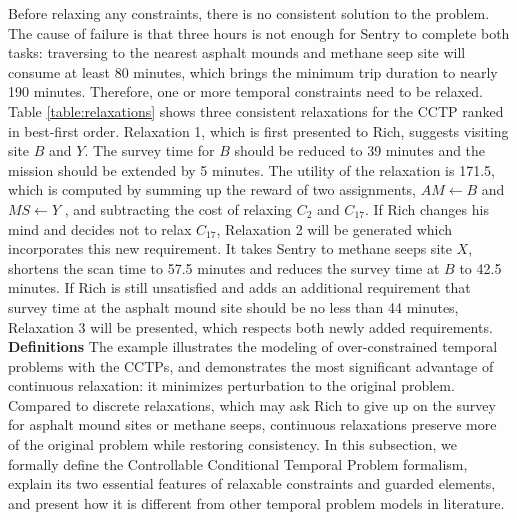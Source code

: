 \documentclass[jair,twoside,11pt,theapa]{article}
\begin{document}
%

Before relaxing any constraints, there is no consistent solution to the problem.
The cause of failure is that three hours is not enough for Sentry to complete
both tasks: traversing to the nearest asphalt mounds and methane seep site
will consume at least 80 minutes, which brings the minimum trip duration to nearly 190
minutes. Therefore, one or more temporal constraints need to be relaxed. Table
\ref{table:relaxations} shows three consistent relaxations for the CCTP ranked
in best-first order. Relaxation 1, which is first presented to Rich, suggests
visiting site $B$ and $Y$. The survey time for $B$ should be reduced to 39
minutes and the mission should be extended by 5 minutes. The utility of the
relaxation is 171.5, which is computed by summing up the reward of two
assignments, $AM \leftarrow B$ and $MS \leftarrow Y$ , and subtracting the cost
of relaxing $C_2$ and $C_{17}$. If Rich changes his mind and decides not to
relax $C_{17}$, Relaxation 2 will be generated which incorporates this new
requirement. It takes Sentry to methane seeps site $X$, shortens the scan time
to 57.5 minutes and reduces the survey time at $B$ to 42.5 minutes. If Rich is still
unsatisfied and adds an additional requirement that survey time at the
asphalt mound site should be no less than 44 minutes, Relaxation 3 will be presented, which respects both newly added requirements.\\



%


\noindent\textbf{Definitions} \indent The example illustrates the
modeling of over-constrained temporal problems with the CCTPs, and demonstrates
the most significant advantage of continuous relaxation: it minimizes
perturbation to the original problem. Compared to discrete relaxations, which
may ask Rich to give up on the survey for asphalt mound sites or methane seeps,
continuous relaxations preserve more of the original problem while restoring
consistency. In this subsection, we formally define the Controllable Conditional
Temporal Problem formalism, explain its two essential features of relaxable
constraints and guarded elements, and present how it is different from other
temporal problem models in literature.
\end{document}
